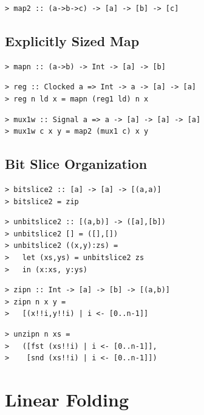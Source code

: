 \documentclass[a4paper,openany,fleqn]{book}
\begin{document}
\begin{verbatim}
> map2 :: (a->b->c) -> [a] -> [b] -> [c]
\end{verbatim}

\subsection{Explicitly Sized Map}
\label{sec:explicitly-sized-map}

\begin{verbatim}
> mapn :: (a->b) -> Int -> [a] -> [b]
\end{verbatim}

\begin{verbatim}
> reg :: Clocked a => Int -> a -> [a] -> [a]
> reg n ld x = mapn (reg1 ld) n x
\end{verbatim}

\begin{verbatim}
> mux1w :: Signal a => a -> [a] -> [a] -> [a]
> mux1w c x y = map2 (mux1 c) x y
\end{verbatim}

\subsection{Bit Slice Organization}
\label{sec:bit-slice-org}

\begin{verbatim}
> bitslice2 :: [a] -> [a] -> [(a,a)]
> bitslice2 = zip
\end{verbatim}

\begin{verbatim}
> unbitslice2 :: [(a,b)] -> ([a],[b])
> unbitslice2 [] = ([],[])
> unbitslice2 ((x,y):zs) =
>   let (xs,ys) = unbitslice2 zs
>   in (x:xs, y:ys)
\end{verbatim}

\begin{verbatim}
> zipn :: Int -> [a] -> [b] -> [(a,b)]
> zipn n x y =
>   [(x!!i,y!!i) | i <- [0..n-1]]
\end{verbatim}

\begin{verbatim}
> unzipn n xs =
>   ([fst (xs!!i) | i <- [0..n-1]],
>    [snd (xs!!i) | i <- [0..n-1]])
\end{verbatim}

\section{Linear Folding}
\label{sec:linear-folding}
\end{document}
